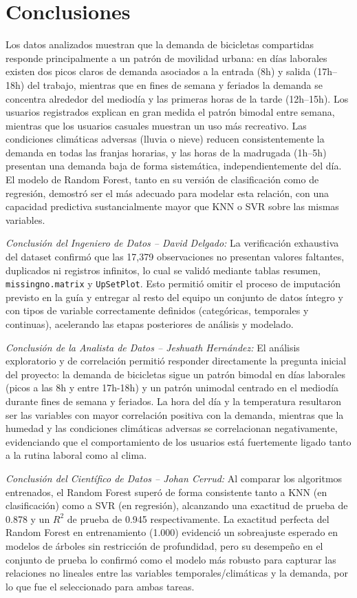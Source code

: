 \documentclass[conference]{IEEEtran}
\begin{document}
\section{Conclusiones}

Los datos analizados muestran que la demanda de bicicletas compartidas responde principalmente a un patrón de movilidad urbana: en días laborales existen dos picos claros de demanda asociados a la entrada (8h) y salida (17h--18h) del trabajo, mientras que en fines de semana y feriados la demanda se concentra alrededor del mediodía y las primeras horas de la tarde (12h--15h). Los usuarios registrados explican en gran medida el patrón bimodal entre semana, mientras que los usuarios casuales muestran un uso más recreativo. Las condiciones climáticas adversas (lluvia o nieve) reducen consistentemente la demanda en todas las franjas horarias, y las horas de la madrugada (1h--5h) presentan una demanda baja de forma sistemática, independientemente del día. El modelo de Random Forest, tanto en su versión de clasificación como de regresión, demostró ser el más adecuado para modelar esta relación, con una capacidad predictiva sustancialmente mayor que KNN o SVR sobre las mismas variables.

\textit{Conclusión del Ingeniero de Datos -- David Delgado:} La verificación exhaustiva del dataset confirmó que las 17{,}379 observaciones no presentan valores faltantes, duplicados ni registros infinitos, lo cual se validó mediante tablas resumen, \texttt{missingno.matrix} y \texttt{UpSetPlot}. Esto permitió omitir el proceso de imputación previsto en la guía y entregar al resto del equipo un conjunto de datos íntegro y con tipos de variable correctamente definidos (categóricas, temporales y continuas), acelerando las etapas posteriores de análisis y modelado.

\textit{Conclusión de la Analista de Datos -- Jeshuath Hernández:} El análisis exploratorio y de correlación permitió responder directamente la pregunta inicial del proyecto: la demanda de bicicletas sigue un patrón bimodal en días laborales (picos a las 8h y entre 17h-18h) y un patrón unimodal centrado en el mediodía durante fines de semana y feriados. La hora del día y la temperatura resultaron ser las variables con mayor correlación positiva con la demanda, mientras que la humedad y las condiciones climáticas adversas se correlacionan negativamente, evidenciando que el comportamiento de los usuarios está fuertemente ligado tanto a la rutina laboral como al clima.

\textit{Conclusión del Científico de Datos -- Johan Cerrud:} Al comparar los algoritmos entrenados, el Random Forest superó de forma consistente tanto a KNN (en clasificación) como a SVR (en regresión), alcanzando una exactitud de prueba de 0.878 y un $R^2$ de prueba de 0.945 respectivamente. La exactitud perfecta del Random Forest en entrenamiento (1.000) evidenció un sobreajuste esperado en modelos de árboles sin restricción de profundidad, pero su desempeño en el conjunto de prueba lo confirmó como el modelo más robusto para capturar las relaciones no lineales entre las variables temporales/climáticas y la demanda, por lo que fue el seleccionado para ambas tareas.
\end{document}
